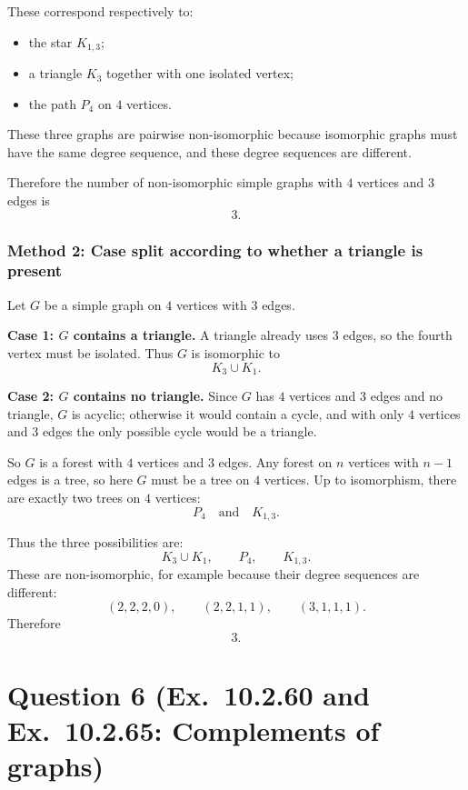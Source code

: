 \documentclass[12pt]{article}
\begin{document}
These correspond respectively to:
\begin{itemize}[leftmargin=*]
  \item the star \(K_{1,3}\);
  \item a triangle \(K_3\) together with one isolated vertex;
  \item the path \(P_4\) on \(4\) vertices.
\end{itemize}

These three graphs are pairwise non-isomorphic because isomorphic graphs must have the same degree sequence, and these degree sequences are different.

Therefore the number of non-isomorphic simple graphs with \(4\) vertices and \(3\) edges is
\[
\boxed{3.}
\]

\subsubsection{Method 2: Case split according to whether a triangle is present}
Let \(G\) be a simple graph on \(4\) vertices with \(3\) edges.

\medskip
\noindent
\textbf{Case 1: \(G\) contains a triangle.}
A triangle already uses \(3\) edges, so the fourth vertex must be isolated. Thus \(G\) is isomorphic to
\[
K_3\cup K_1.
\]

\medskip
\noindent
\textbf{Case 2: \(G\) contains no triangle.}
Since \(G\) has \(4\) vertices and \(3\) edges and no triangle, \(G\) is acyclic; otherwise it would contain a cycle, and with only \(4\) vertices and \(3\) edges the only possible cycle would be a triangle.

So \(G\) is a forest with \(4\) vertices and \(3\) edges. Any forest on \(n\) vertices with \(n-1\) edges is a tree, so here \(G\) must be a tree on \(4\) vertices. Up to isomorphism, there are exactly two trees on \(4\) vertices:
\[
P_4 \quad\text{and}\quad K_{1,3}.
\]

Thus the three possibilities are:
\[
K_3\cup K_1,\qquad P_4,\qquad K_{1,3}.
\]
These are non-isomorphic, for example because their degree sequences are different:
\[
(2,2,2,0),\qquad (2,2,1,1),\qquad (3,1,1,1).
\]
Therefore
\[
\boxed{3.}
\]

\newpage

\section{Question 6 (Ex.\ 10.2.60 and Ex.\ 10.2.65: Complements of graphs)}
\end{document}
